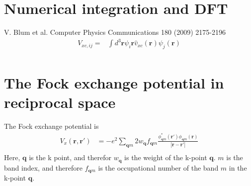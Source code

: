 \documentclass[a4paper,12pt]{article}
\begin{document}
\section{Numerical integration and DFT}
V. Blum et al. Computer Physics Communications 180 (2009) 2175-2196
\begin{equation}
	\begin{split}
		V_{xc,ij} = &\int d^3\textbf{r}\psi_i\textbf{r}\hat{v}_{xc}(\textbf{r})\psi_j(\textbf{r})\\
	\end{split}
\end{equation}

\newpage


\section{The Fock exchange potential in reciprocal space}
The Fock exchange potential is
\begin{equation}
    \begin{split}
        V_{x}(\boldsymbol{r},\boldsymbol{r}')&=
        -e^2\sum_{\boldsymbol{q}m}2w_{\boldsymbol{q}}f_{\boldsymbol{q}m}
        \frac{\phi_{\boldsymbol{q}m}^{*}(\boldsymbol{r}')\phi_{\boldsymbol{q}m}(\boldsymbol{r})}{|\boldsymbol{r}-\boldsymbol{r}'|}\\
    \end{split}
\end{equation}
Here, $\boldsymbol{q}$ is the k point, and therefor $w_{\boldsymbol{q}}$ is the weight of the k-point $\boldsymbol{q}$. $m$ is the band index, and
therefore $f_{\boldsymbol{q}m}$ is the occupational number of the band $m$ in the k-point $\boldsymbol{q}$.
\end{document}
